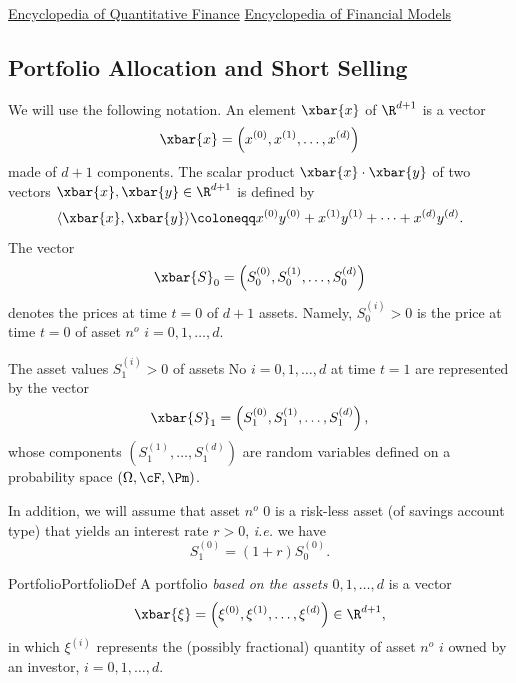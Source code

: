 \href{https://onlinelibrary.wiley.com/doi/book/10.1002/9780470061602}{Encyclopedia of Quantitative Finance}
\href{https://onlinelibrary.wiley.com/doi/book/10.1002/9781118182635}{Encyclopedia of Financial Models}


\subsection{Portfolio Allocation and Short Selling}

\noindent We will use the following notation. An element $\xbar{x}$ of $\R^{d+1}$ is a vector
\begin{equation} \label{eq:VectorDefinition}
    \xbar{x} = \left(x^{(0)}, x^{(1)}, \dots, x^{(d)}\right)
\end{equation}
made of $d+1$ components. The scalar product $\xbar{x} \cdot \xbar{y}$ of two vectors $\xbar{x}, \xbar{y} \in \R^{d+1}$ is defined by
\begin{equation} \label{eq:ScalarProductDefinition}
    \langle\xbar{x}, \xbar{y}\rangle \coloneqq x^{(0)}y^{(0)} + x^{(1)}y^{(1)} + \dots + x^{(d)}y^{(d)}.
\end{equation}
The vector
\begin{equation} \label{eq:PriceVectorT0}
    \xbar{S}_0 = \left(S_0^{(0)}, S_0^{(1)}, \dots, S_0^{(d)}\right)
\end{equation}
denotes the prices at time $t=0$ of $d+1$ assets. Namely, $S_0^{(i)} > 0$ is the price at time $t=0$ of asset $n^o$ $i=0, 1, \dots, d$.

The asset values $S_1^{(i)} > 0$ of assets No $i=0, 1, \dots, d$ at time $t=1$ are represented by the vector
\begin{equation} \label{eq:PriceVectorT1}
    \xbar{S}_1 = \left(S_1^{(0)}, S_1^{(1)}, \dots, S_1^{(d)}\right),
\end{equation}
whose components $\left(S_1^{(1)}, \dots, S_1^{(d)}\right)$ are random variables defined on a probability space $(\Omega, \cF, \Pm)$.

In addition, we will assume that asset $n^o$ 0 is a risk-less asset (of savings account type) that yields an interest rate $r > 0$, \textit{i.e.} we have
\begin{equation} \label{eq:RisklessAssetDynamics}
    S_1^{(0)} = (1+r)S_0^{(0)}.
\end{equation}

\begin{defn}{Portfolio}{PortfolioDef}
    A portfolio \textit{based on the assets $0,1,\dots,d$} is a vector
    \begin{equation} \label{eq:PortfolioVector}
        \xbar{\xi} = \left(\xi^{(0)}, \xi^{(1)}, \dots, \xi^{(d)}\right) \in \R^{d+1},
    \end{equation}
    in which $\xi^{(i)}$ represents the (possibly fractional) quantity of asset $n^o$ $i$ owned by an investor, $i=0, 1, \dots, d$.
\end{defn}

